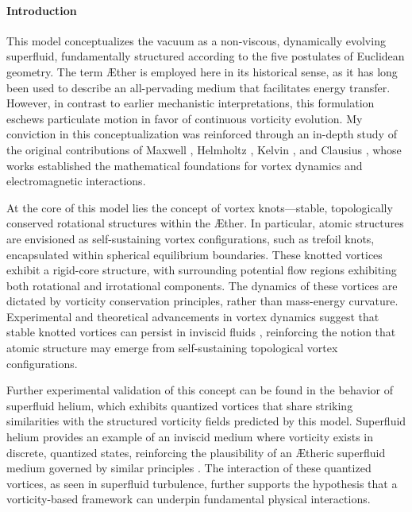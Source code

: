 \documentclass[a4paper,10pt]{article}
\begin{document}
    \paragraph{Introduction}
    This model conceptualizes the vacuum as a non-viscous, dynamically evolving superfluid, fundamentally structured according to the five postulates of Euclidean geometry. The term Æther is employed here in its historical sense, as it has long been used to describe an all-pervading medium that facilitates energy transfer. However, in contrast to earlier mechanistic interpretations, this formulation eschews particulate motion in favor of continuous vorticity evolution. My conviction in this conceptualization was reinforced through an in-depth study of the original contributions of Maxwell \cite{maxwell1861}, Helmholtz \cite{helmholtz1858}, Kelvin \cite{kelvin1867}, and Clausius \cite{clausius1865}, whose works established the mathematical foundations for vortex dynamics and electromagnetic interactions.

    At the core of this model lies the concept of vortex knots—stable, topologically conserved rotational structures within the Æther. In particular, atomic structures are envisioned as self-sustaining vortex configurations, such as trefoil knots, encapsulated within spherical equilibrium boundaries. These knotted vortices exhibit a rigid-core structure, with surrounding potential flow regions exhibiting both rotational and irrotational components. The dynamics of these vortices are dictated by vorticity conservation principles, rather than mass-energy curvature. Experimental and theoretical advancements in vortex dynamics suggest that stable knotted vortices can persist in inviscid fluids \cite{kleckner2013}, reinforcing the notion that atomic structure may emerge from self-sustaining topological vortex configurations.

    Further experimental validation of this concept can be found in the behavior of superfluid helium, which exhibits quantized vortices that share striking similarities with the structured vorticity fields predicted by this model. Superfluid helium provides an example of an inviscid medium where vorticity exists in discrete, quantized states, reinforcing the plausibility of an Ætheric superfluid medium governed by similar principles \cite{vinen2002}. The interaction of these quantized vortices, as seen in superfluid turbulence, further supports the hypothesis that a vorticity-based framework can underpin fundamental physical interactions.
\end{document}
